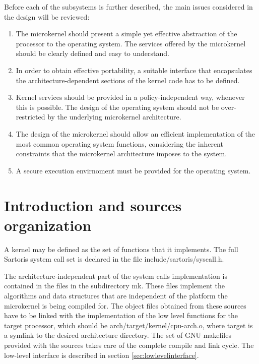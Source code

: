 \documentclass[11pt, letterpaper, twoside, english]{book}
\begin{document}
\noindent{}Before each of the subsystems is further described, the main issues considered in the design will be reviewed:
\begin{enumerate}
\item[] The microkernel should present a simple yet effective abstraction of the processor to the operating system. The services offered by the microkernel should be clearly defined and easy to understand.
\item[] In order to obtain effective portability, a suitable interface that encapsulates the architecture-dependent sections of the kernel code has to be defined.
\item[] Kernel services should be provided in a policy-independent way, whenever this is possible. The design of the operating system should not be over-restricted by the underlying microkernel architecture.
\item[] The design of the microkernel should allow an efficient implementation of the most common operating system functions, considering the inherent constraints that the microkernel architecture imposes to the system.
\item[] A secure execution envirnoment must be provided for the operating system.
\end{enumerate}

\section{Introduction and sources organization}
A kernel may be defined as the set of functions that it implements. The full Sartoris system call set is declared in the file \textsf{include/sartoris/syscall.h}.

The architecture-independent part of the system calls implementation is contained in the files in the subdirectory \textsf{mk}. These files implement the algorithms and data structures that are independent of the platform the microkernel is being compiled for. The object files obtained from these sources have to be linked with the implementation of the low level functions for the target processor, which should be \textsf{arch/target/kernel/cpu-arch.o}, where \textsf{target} is a symlink to the desired architecture directory. The set of GNU makefiles provided with the sources takes care of the complete compile and link cycle. The low-level interface is described in section \ref{sec:lowlevelinterface}.
\end{document}
